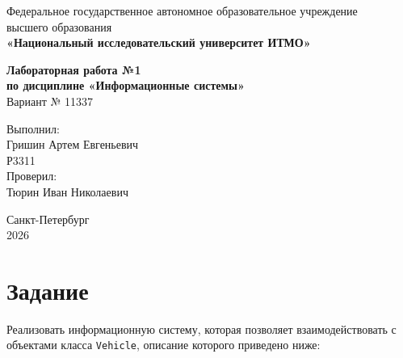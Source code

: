 \documentclass[a4paper,12pt]{article}
\begin{document}
\begin{titlepage}
\begin{center}
Федеральное государственное автономное образовательное учреждение\\
высшего образования\\
\textbf{«Национальный исследовательский университет ИТМО»}

\vfill

\textbf{\Large Лабораторная работа №1}\\[0.5em]
\textbf{\large по дисциплине «Информационные системы»}\\[1em]
Вариант № 11337

\vfill

\begin{flushright}
Выполнил:\\
Гришин Артем Евгеньевич\\
Р3311\\[1em]
Проверил:\\
Тюрин Иван Николаевич
\end{flushright}

\vfill

Санкт-Петербург\\
2026
\end{center}
\end{titlepage}

\tableofcontents
\newpage

\section{Задание}

Реализовать информационную систему, которая позволяет взаимодействовать с объектами класса
\texttt{Vehicle}, описание которого приведено ниже:
\end{document}
